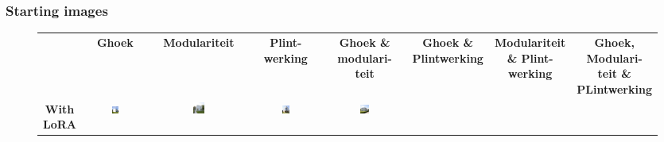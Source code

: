 \subsubsection{Starting images}
\begin{figure}[H]
  \centering
  {\footnotesize
  \renewcommand{\arraystretch}{1.1}
  \setlength{\tabcolsep}{4pt}
  \begin{tabular}{c c c c c c c c}
    & \textbf{Ghoek} & \textbf{Modulariteit} & \shortstack{\textbf{Plint-}\\\textbf{werking}}
    & \shortstack{\textbf{Ghoek \&}\\ \textbf{modulari-}\\\textbf{teit}} 
    & \shortstack{\textbf{Ghoek \&}\\ \textbf{Plintwerking}} 
    & \shortstack{\textbf{Modulariteit} \\ \textbf{ \& Plint-}\\\textbf{werking}} 
    & \shortstack{\textbf{Ghoek,}\\\textbf{Modulari-}\\\textbf{teit \&}\\\textbf{PLintwerking}} \\
    \shortstack{\textbf{With}\\\textbf{LoRA}} & 
    \includegraphics[width=0.12\textwidth]{Images/Results/Architect-B_Fixed-images/2-preliminary_design/Met_lora_00027_.png} & 
    \includegraphics[width=0.12\textwidth]{Images/Results/Architect-B_Fixed-images/2-preliminary_design/Met_lora_00028_.png} &
    \includegraphics[width=0.12\textwidth]{Images/Results/Architect-B_Fixed-images/2-preliminary_design/Met_lora_00030_.png} &
    \includegraphics[width=0.12\textwidth]{Images/Results/Architect-B_Fixed-images/2-preliminary_design/Met_lora_00035_.png} &

\end{tabular}}
\end{figure}
